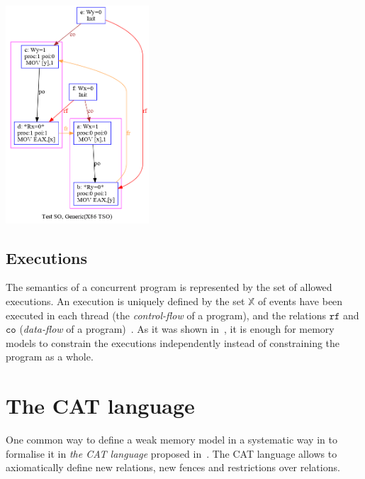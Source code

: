 \includegraphics[width=0.4\textwidth]{img/my/simple_wmm_x86.png}
\label{simple_wmm_x86_pic}

\subsection{Executions}
\label{ch:wmm:model:executions}

The semantics of a concurrent program is represented by the set of allowed executions.
An execution is uniquely defined by the set $\mathbb{X}$ of events have been executed in each thread (the \textit{control-flow} of a program), and the relations $\mathtt{rf}$ and $\mathtt{co}$ (\textit{data-flow} of a program)~\cite{alglave2010shared}. As it was shown in~\cite{wickerson2017automatically}, it is enough for memory models to constrain the executions independently instead of constraining the program as a whole.

\section{The CAT language}

One common way to define a weak memory model in a systematic way in to formalise it in \textit{the CAT language} proposed in~\cite{alglave2016syntax}. The CAT language allows to axiomatically define new relations, new fences and restrictions over relations.




